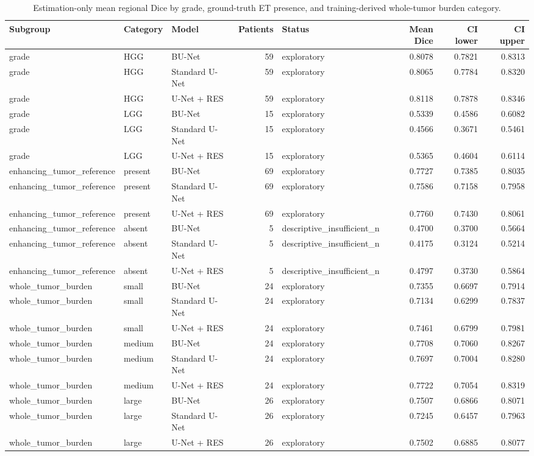 \begin{table}[htbp]
\caption{Estimation-only mean regional Dice by grade, ground-truth ET presence, and training-derived whole-tumor burden category.}
\label{tab:table06_exploratory_subgroups}
\begin{tabular}{lllrlrrr}
\toprule
Subgroup & Category & Model & Patients & Status & Mean Dice & CI lower & CI upper \\
\midrule
grade & HGG & BU-Net & 59 & exploratory & 0.8078 & 0.7821 & 0.8313 \\
grade & HGG & Standard U-Net & 59 & exploratory & 0.8065 & 0.7784 & 0.8320 \\
grade & HGG & U-Net + RES & 59 & exploratory & 0.8118 & 0.7878 & 0.8346 \\
grade & LGG & BU-Net & 15 & exploratory & 0.5339 & 0.4586 & 0.6082 \\
grade & LGG & Standard U-Net & 15 & exploratory & 0.4566 & 0.3671 & 0.5461 \\
grade & LGG & U-Net + RES & 15 & exploratory & 0.5365 & 0.4604 & 0.6114 \\
enhancing\_tumor\_reference & present & BU-Net & 69 & exploratory & 0.7727 & 0.7385 & 0.8035 \\
enhancing\_tumor\_reference & present & Standard U-Net & 69 & exploratory & 0.7586 & 0.7158 & 0.7958 \\
enhancing\_tumor\_reference & present & U-Net + RES & 69 & exploratory & 0.7760 & 0.7430 & 0.8061 \\
enhancing\_tumor\_reference & absent & BU-Net & 5 & descriptive\_insufficient\_n & 0.4700 & 0.3700 & 0.5664 \\
enhancing\_tumor\_reference & absent & Standard U-Net & 5 & descriptive\_insufficient\_n & 0.4175 & 0.3124 & 0.5214 \\
enhancing\_tumor\_reference & absent & U-Net + RES & 5 & descriptive\_insufficient\_n & 0.4797 & 0.3730 & 0.5864 \\
whole\_tumor\_burden & small & BU-Net & 24 & exploratory & 0.7355 & 0.6697 & 0.7914 \\
whole\_tumor\_burden & small & Standard U-Net & 24 & exploratory & 0.7134 & 0.6299 & 0.7837 \\
whole\_tumor\_burden & small & U-Net + RES & 24 & exploratory & 0.7461 & 0.6799 & 0.7981 \\
whole\_tumor\_burden & medium & BU-Net & 24 & exploratory & 0.7708 & 0.7060 & 0.8267 \\
whole\_tumor\_burden & medium & Standard U-Net & 24 & exploratory & 0.7697 & 0.7004 & 0.8280 \\
whole\_tumor\_burden & medium & U-Net + RES & 24 & exploratory & 0.7722 & 0.7054 & 0.8319 \\
whole\_tumor\_burden & large & BU-Net & 26 & exploratory & 0.7507 & 0.6866 & 0.8071 \\
whole\_tumor\_burden & large & Standard U-Net & 26 & exploratory & 0.7245 & 0.6457 & 0.7963 \\
whole\_tumor\_burden & large & U-Net + RES & 26 & exploratory & 0.7502 & 0.6885 & 0.8077 \\
\bottomrule
\end{tabular}
\end{table}
